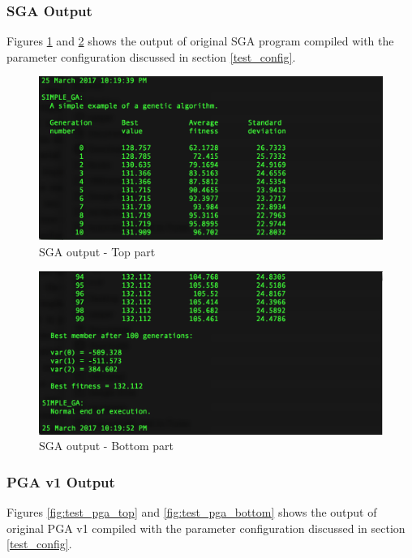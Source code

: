 \subsubsection{SGA Output}

Figures \ref{fig:test_sga_top} and \ref{fig:test_sga_bottom} shows the output of original SGA program compiled with the parameter configuration discussed in section \ref{test_config}.

\begin{figure}[!htb]
	\center
        \includegraphics[width= \linewidth]{figs/tests/sga_top.png}
    \caption{SGA output - Top part}
     \label{fig:test_sga_top}
\end{figure}

\begin{figure}[!htb]
	\center
        \includegraphics[width= \linewidth]{figs/tests/sga_bottom.png}
    \caption{SGA output - Bottom part}
     \label{fig:test_sga_bottom}
\end{figure}

\subsubsection{PGA v1 Output}

Figures \ref{fig:test_pga_top} and \ref{fig:test_pga_bottom} shows the output of original PGA v1 compiled with the parameter configuration discussed in section \ref{test_config}.

